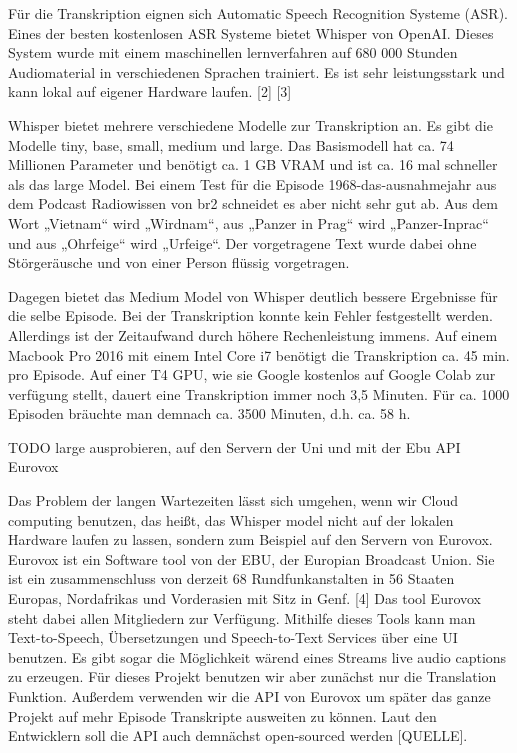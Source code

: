 Für die Transkription eignen sich Automatic Speech Recognition Systeme (ASR). 
Eines der besten kostenlosen ASR Systeme bietet Whisper von OpenAI. 
Dieses System wurde mit einem maschinellen lernverfahren auf 680 000 Stunden Audiomaterial in verschiedenen Sprachen trainiert. 
Es ist sehr leistungsstark und kann lokal auf eigener Hardware laufen. [2] [3]

Whisper bietet mehrere verschiedene Modelle zur Transkription an. Es gibt die Modelle tiny, base, small, medium und large. 
Das Basismodell hat ca. 74 Millionen Parameter und benötigt ca. 1 GB VRAM und ist ca. 16 mal schneller als das large Model. 
Bei einem Test für die Episode 1968-das-ausnahmejahr aus dem Podcast Radiowissen von br2 schneidet es aber nicht sehr gut ab. 
Aus dem Wort „Vietnam“ wird „Wirdnam“, aus „Panzer in Prag“ wird „Panzer-Inprac“ und aus  „Ohrfeige“ wird „Urfeige“. 
Der vorgetragene Text wurde dabei ohne Störgeräusche und von einer Person flüssig vorgetragen. 

Dagegen bietet das Medium Model von Whisper deutlich bessere Ergebnisse für die selbe Episode. 
Bei der Transkription konnte kein Fehler festgestellt werden. Allerdings ist der Zeitaufwand durch höhere Rechenleistung immens. 
Auf einem Macbook Pro 2016 mit einem Intel Core i7 benötigt die Transkription ca. 45 min. pro Episode. 
Auf einer T4 GPU, wie sie Google kostenlos auf Google Colab zur verfügung stellt, dauert eine Transkription immer noch 3,5 Minuten. 
Für ca. 1000 Episoden bräuchte man demnach ca. 3500 Minuten, d.h. ca. 58 h. 

TODO large ausprobieren, auf den Servern der Uni und mit der Ebu API
Eurovox

Das Problem der langen Wartezeiten lässt sich umgehen, wenn wir Cloud computing benutzen, das heißt, das Whisper model nicht auf der lokalen Hardware laufen zu lassen, sondern zum Beispiel auf den Servern von Eurovox. 
Eurovox ist ein Software tool von der EBU, der Europian Broadcast Union. 
Sie ist ein zusammenschluss von derzeit 68 Rundfunkanstalten in 56 Staaten Europas, Nordafrikas und Vorderasien mit Sitz in Genf. [4] 
Das tool Eurovox steht dabei allen Mitgliedern zur Verfügung.  
Mithilfe dieses Tools kann man Text-to-Speech, Übersetzungen und Speech-to-Text Services über eine UI benutzen. 
Es gibt sogar die Möglichkeit wärend eines Streams live audio captions zu erzeugen. 
Für dieses Projekt benutzen wir aber zunächst nur die Translation Funktion. 
Außerdem verwenden wir die API von Eurovox um später das ganze Projekt auf mehr Episode Transkripte ausweiten zu können. 
Laut den Entwicklern soll die API auch demnächst open-sourced werden [QUELLE].

